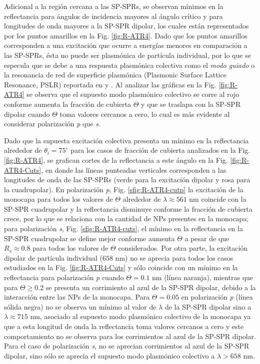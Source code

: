 Adicional a la región cercana a las SP-SPRs, se observan mínimos en la reflectancia para ángulos de incidencia mayores al ángulo crítico y para longitudes de onda mayores a la SP-SPR dipolar, los cuales están  representados por los puntos amarillos en la Fig. \ref{fig:R-ATR4}. Dado que los puntos amarillos corresponden a una excitación que ocurre a energías  menores en comparación a las SP-SPRs, ésta no puede ser plasmónica de partícula individual,  por lo que se especula que se debe a una respuesta plasmónica colectiva como el \emph{modo guiado} o la resonancia de red de superficie plasmónica (Plasmonic Surface Lattice Resonance, PSLR) reportada en \cite{kabashin2009plasmonic} y \cite{danilov2018ultra}. Al analizar las gráficas en la  Fig.  \ref{fig:R-ATR4} se observa que el supuesto modo plasmónico colectivo se corre al rojo  conforme aumenta la fracción de cubierta $\Theta$ y que se traslapa con la SP-SPR dipolar cuando $\Theta$ toma valores cercanos a cero, lo cual es más evidente al considerar polarización \emph{p} que \emph{s}.

Dado que la supuesta excitación colectiva presenta un mínimo en la reflectancia  alrededor de $\theta_i = 75^\circ$ para los casos de fracción de cubierta analizados en la Fig.  \ref{fig:R-ATR4}, se grafican cortes de la reflectancia a este ángulo en la Fig. \ref{fig:R-ATR4-Cuts}, en donde las líneas punteadas verticales corresponden a las longitudes de onda de las SP-SPRs (verde para la excitación dipolar y rosa para la cuadrupolar). En polarización \emph{p}, Fig. \ref{sfig:R-ATR4-cutp} la excitación de la monocapa para todos los valores de $\Theta$ alrededor de $\lambda \approx 561$ nm coincide con la SP-SPR cuadrupolar y la reflectancia disminuye conforme la fracción de cubierta crece, por lo que se relaciona con la cantidad de NPs presentes en la monocapa; para polarización \emph{s}, Fig. \ref{sfig:R-ATR4-cuts}, el mínimo en la reflectancia en la SP-SPR cuadrupolar se define mejor conforme aumenta $\Theta$ a pesar de que $R_s\approx 0.8$ para todos los valores de $\Theta$ considerados. Por otra parte, la excitación dipolar de partícula individual ($658$ nm) no se aprecia para todos los casos estudiados en la Fig. \ref{fig:R-ATR4-Cuts} y sólo coincide con un mínimo en la reflectancia para polarización \emph{p} cuando $\Theta=0.1$ nm (línea naranja), mientras que para $\Theta \geq 0.2$ se presenta un corrimiento al azul de la SP-SPR dipolar, debido a la interacción entre las NPs de la monocapa. Para $\Theta=0.05$ en polarización \emph{p} (línea sólida negra) no se observa un mínimo al valor de $\lambda$ de la SP-SPR dipolar sino a $\lambda\approx 715$ nm, asociado al supuesto modo plasmónico colectivo de la monocapa ya que a esta longitud de onda la reflectancia toma valores cercanos a cero y este comportamiento no se observa para los corrimientos al azul de la SP-SPR dipolar. Para el caso de polarización \emph{s}, no se aprecian corrimientos al azul de la SP-SPR dipolar, sino sólo se aprecia el supuesto modo plasmónico colectivo a $\lambda>658$ nm.

